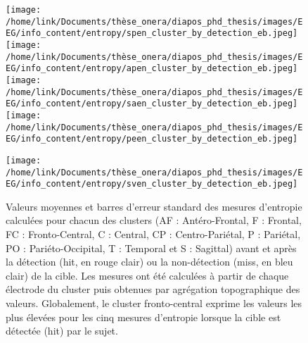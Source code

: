 \begin{figure*}[!t]
\begin{multicols}{2}
\texttt{[image: /home/link/Documents/thèse\_onera/diapos\_phd\_thesis/images/EEG/info\_content/entropy/spen\_cluster\_by\_detection\_eb.jpeg]}
\texttt{[image: /home/link/Documents/thèse\_onera/diapos\_phd\_thesis/images/EEG/info\_content/entropy/apen\_cluster\_by\_detection\_eb.jpeg]}
\texttt{[image: /home/link/Documents/thèse\_onera/diapos\_phd\_thesis/images/EEG/info\_content/entropy/saen\_cluster\_by\_detection\_eb.jpeg]}
\texttt{[image: /home/link/Documents/thèse\_onera/diapos\_phd\_thesis/images/EEG/info\_content/entropy/peen\_cluster\_by\_detection\_eb.jpeg]}
\end{multicols}
\centering \texttt{[image: /home/link/Documents/thèse\_onera/diapos\_phd\_thesis/images/EEG/info\_content/entropy/sven\_cluster\_by\_detection\_eb.jpeg]}
\caption[Valeurs des mesures d'entropie calculées pour chacun des clusters avant et après la détection/non-détection]{Valeurs moyennes et barres d'erreur standard des mesures d'entropie calculées pour chacun des clusters (AF : Antéro-Frontal, F : Frontal, FC : Fronto-Central, C : Central, CP : Centro-Pariétal, P : Pariétal, PO : Pariéto-Occipital, T : Temporal et S : Sagittal) avant et après la détection (hit, en rouge clair) ou la non-détection (miss, en bleu clair) de la cible. Les mesures ont été calculées à partir de chaque électrode du cluster puis obtenues par agrégation topographique des valeurs. Globalement, le cluster fronto-central exprime les valeurs les plus élevées pour les cinq mesures d'entropie lorsque la cible est détectée (hit) par le sujet.}
\label{fig:figure5valeursmesuresentropie}
\end{figure*}

